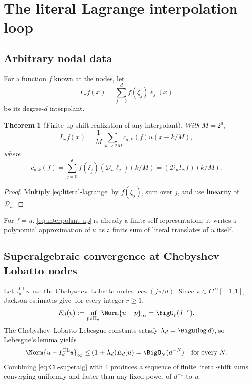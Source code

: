 \documentclass[11pt]{article}
\newtheorem{theorem}{Theorem}[section]
\theoremstyle{definition}
\theoremstyle{remark}
\newcommand{\Dscr}{\mathscr D_{u}}
\begin{document}
\section{The literal Lagrange interpolation loop}
\label{sec:interpolation-loop}

\subsection{Arbitrary nodal data}

For a function $f$ known at the nodes, let
\begin{equation}
 I_\Xi f(x)=\sum_{j=0}^{d}f(\xi_j)\ell_j(x)
 \label{eq:lagrange-interpolant}
\end{equation}
be its degree-$d$ interpolant.

\begin{theorem}[Finite up-shift realization of any interpolant]
\label{thm:interpolant-loop}
With $M=2^d$,
\begin{equation}
 \boxed{
 I_\Xi f(x)=\frac1M\sum_{|k|<2M}
 c_{d,k}(f)u(x-k/M),}
 \label{eq:interpolant-up}
\end{equation}
where
\begin{equation}
 c_{d,k}(f)
 =\sum_{j=0}^{d}f(\xi_j)(\Dscr\ell_j)(k/M)
 =(\Dscr I_\Xi f)(k/M).
 \label{eq:interpolant-coeff}
\end{equation}
\end{theorem}

\begin{proof}
Multiply \eqref{eq:literal-lagrange} by $f(\xi_j)$, sum over $j$, and use
linearity of $\Dscr$.
\end{proof}

For $f=u$, \eqref{eq:interpolant-up} is already a finite self-representation:
it writes a polynomial approximation of $u$ as a finite sum of literal
translates of $u$ itself.

\subsection{Superalgebraic convergence at Chebyshev--Lobatto nodes}

Let $I_d^{\mathrm{CL}}u$ use the Chebyshev--Lobatto nodes
$\cos(j\pi/d)$.  Since $u\in C^\infty[-1,1]$, Jackson estimates give, for
every integer $r\ge1$,
\[
 E_d(u):=\inf_{p\in\Pi_d}\Norm{u-p}_\infty=\BigO_r(d^{-r}).
\]
The Chebyshev--Lobatto Lebesgue constants satisfy $\Lambda_d=\BigO(\log d)$,
so Lebesgue's lemma yields
\begin{equation}
 \Norm{u-I_d^{\mathrm{CL}}u}_\infty
 \le(1+\Lambda_d)E_d(u)
 =\BigO_N(d^{-N})
 \quad\text{for every }N.
 \label{eq:CL-superalg}
\end{equation}
Combining \eqref{eq:CL-superalg} with \cref{thm:interpolant-loop} produces a
sequence of finite literal-shift sums converging uniformly and faster than any
fixed power of $d^{-1}$ to $u$.
\end{document}
